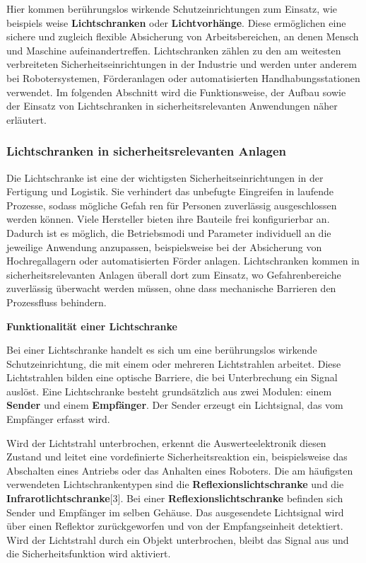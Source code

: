Hier kommen berührungslos wirkende Schutzeinrichtungen zum Einsatz, wie beispiels
weise \textbf{Lichtschranken} oder \textbf{Lichtvorhänge}. Diese ermöglichen eine sichere und
zugleich flexible Absicherung von Arbeitsbereichen, an denen Mensch und Maschine
aufeinandertreffen.
Lichtschranken zählen zu den am weitesten verbreiteten Sicherheitseinrichtungen in
der Industrie und werden unter anderem bei Robotersystemen, Förderanlagen oder
automatisierten Handhabungsstationen verwendet.
Im folgenden Abschnitt wird die Funktionsweise, der Aufbau sowie der Einsatz von
Lichtschranken in sicherheitsrelevanten Anwendungen näher erläutert.

\subsubsection{Lichtschranken in sicherheitsrelevanten Anlagen}
Die Lichtschranke ist eine der wichtigsten Sicherheitseinrichtungen in der Fertigung und
Logistik.
Sie verhindert das unbefugte Eingreifen in laufende Prozesse, sodass mögliche Gefah
ren für Personen zuverlässig ausgeschlossen werden können.
Viele Hersteller bieten ihre Bauteile frei konfigurierbar an. Dadurch ist es möglich,
die Betriebsmodi und Parameter individuell an die jeweilige Anwendung anzupassen,
beispielsweise bei der Absicherung von Hochregallagern oder automatisierten Förder
anlagen.
Lichtschranken kommen in sicherheitsrelevanten Anlagen überall dort zum Einsatz, wo
Gefahrenbereiche zuverlässig überwacht werden müssen, ohne dass mechanische
Barrieren den Prozessfluss behindern.


\textbf{Funktionalität einer Lichtschranke}


Bei einer Lichtschranke handelt es sich um eine berührungslos wirkende Schutzeinrichtung, die mit einem oder mehreren Lichtstrahlen arbeitet. Diese Lichtstrahlen bilden
eine optische Barriere, die bei Unterbrechung ein Signal auslöst.
Eine Lichtschranke besteht grundsätzlich aus zwei Modulen: einem \textbf{Sender} und einem
\textbf{Empfänger}. Der Sender erzeugt ein Lichtsignal, das vom Empfänger erfasst wird. 

Wird
der Lichtstrahl unterbrochen, erkennt die Auswerteelektronik diesen Zustand und leitet
eine vordefinierte Sicherheitsreaktion ein, beispielsweise das Abschalten eines Antriebs oder das Anhalten eines Roboters.
Die am häufigsten verwendeten Lichtschrankentypen sind die \textbf{Reflexionslichtschranke}
und die \textbf{Infrarotlichtschranke}[3].
Bei einer \textbf{Reflexionslichtschranke} befinden sich Sender und Empfänger im selben
Gehäuse. Das ausgesendete Lichtsignal wird über einen Reflektor zurückgeworfen und
von der Empfangseinheit detektiert. Wird der Lichtstrahl durch ein Objekt unterbrochen,
bleibt das Signal aus und die Sicherheitsfunktion wird aktiviert.

